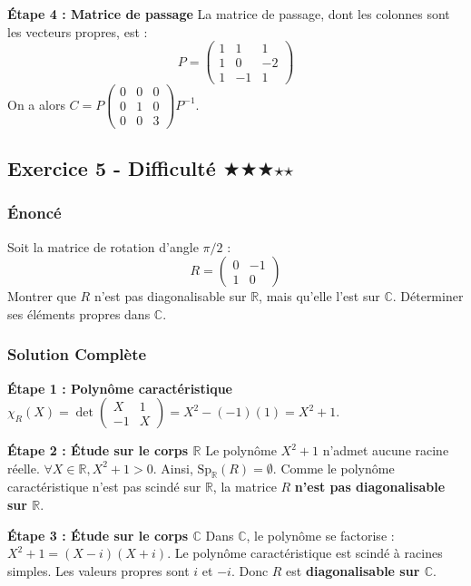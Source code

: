 \documentclass[11pt,a4paper]{article}
\begin{document}
\textbf{Étape 4 : Matrice de passage}
La matrice de passage, dont les colonnes sont les vecteurs propres, est :
$$P = \begin{pmatrix} 1 & 1 & 1 \\ 1 & 0 & -2 \\ 1 & -1 & 1 \end{pmatrix}$$
On a alors $C = P \begin{pmatrix} 0 & 0 & 0 \\ 0 & 1 & 0 \\ 0 & 0 & 3 \end{pmatrix} P^{-1}$.


\subsection*{Exercice 5 - Difficulté \quad $\bigstar$$\bigstar$$\bigstar$$\star$$\star$}

\subsubsection*{Énoncé}
Soit la matrice de rotation d'angle $\pi/2$ :
$$R = \begin{pmatrix} 0 & -1 \\ 1 & 0 \end{pmatrix}$$
Montrer que $R$ n'est pas diagonalisable sur $\mathbb{R}$, mais qu'elle l'est sur $\mathbb{C}$. Déterminer ses éléments propres dans $\mathbb{C}$.

\subsubsection*{Solution Complète}

\textbf{Étape 1 : Polynôme caractéristique}
$\chi_R(X) = \det\begin{pmatrix} X & 1 \\ -1 & X \end{pmatrix} = X^2 - (-1)(1) = X^2 + 1$.

\textbf{Étape 2 : Étude sur le corps $\mathbb{R}$}
Le polynôme $X^2 + 1$ n'admet aucune racine réelle.
$\forall X \in \mathbb{R}, X^2 + 1 > 0$.
Ainsi, $\text{Sp}_{\mathbb{R}}(R) = \emptyset$.
Comme le polynôme caractéristique n'est pas scindé sur $\mathbb{R}$, la matrice $R$ \textbf{n'est pas diagonalisable sur $\mathbb{R}$}.

\textbf{Étape 3 : Étude sur le corps $\mathbb{C}$}
Dans $\mathbb{C}$, le polynôme se factorise : $X^2 + 1 = (X - i)(X + i)$.
Le polynôme caractéristique est scindé à racines simples. Les valeurs propres sont $i$ et $-i$.
Donc $R$ est \textbf{diagonalisable sur $\mathbb{C}$}.
\end{document}
